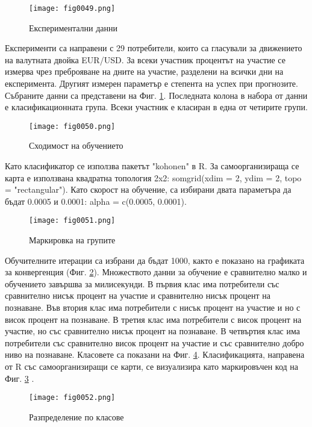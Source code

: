\begin{figure}[H]
  \centering
  \texttt{[image: fig0049.png]}
  \caption{Експериментални данни}
\label{fig0049}
\end{figure}

Експерименти са направени с 29 потребители, които са гласували за движението на валутната двойка EUR/USD. За всеки участник процентът на участие се измерва чрез преброяване на дните на участие, разделени на всички дни на експеримента. Другият измерен параметър е степента на успех при прогнозите. Събраните данни са представени на Фиг. \ref{fig0049}. Последната колона в набора от данни е класификационната група. Всеки участник е класиран в една от четирите групи.

\begin{figure}[H]
  \centering
  \texttt{[image: fig0050.png]}
  \caption{Сходимост на обучението}
\label{fig0050}
\end{figure}

Като класификатор се използва пакетът "kohonen" в R. За самоорганизираща се карта е използвана квадратна топология 2x2: somgrid(xdim = 2, ydim = 2, topo = "rectangular"). Като скорост на обучение, са избирани двата параметъра да бъдат 0.0005 и 0.0001: alpha = c(0.0005, 0.0001).

\begin{figure}[H]
  \centering
  \texttt{[image: fig0051.png]}
  \caption{Маркировка на групите}
\label{fig0051}
\end{figure}

Обучителните итерации са избрани да бъдат 1000, както е показано на графиката за конвергенция (Фиг. \ref{fig0050}). Множеството данни за обучение е сравнително малко и обучението завършва за милисекунди. В първия клас има потребители със сравнително нисък процент на участие и сравнително нисък процент на познаване. Във втория клас има потребители с нисък процент на участие и но с висок процент на познаване. В третия клас има потребители с висок процент на участие, но със сравнително нисък процент на познаване. В четвъртия клас има потребители със сравнително висок процент на участие и със сравнително добро ниво на познаване. Класовете са показани на Фиг. \ref{fig0052}. Класификацията, направена от R със самоорганизиращи се карти, се визуализира като маркировъчен код на Фиг. \ref{fig0051} \cite{Tomov-03}.

\begin{figure}[H]
  \centering
  \texttt{[image: fig0052.png]}
  \caption{Разпределение по класове}
\label{fig0052}
\end{figure}

